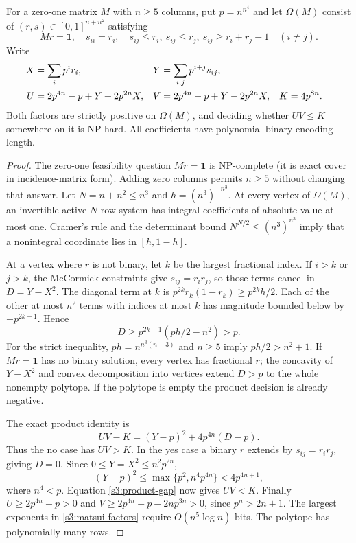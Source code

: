 \begin{lemma}\label{s3:matsui}
For a zero-one matrix $M$ with $n\ge5$ columns, put $p=n^{n^4}$ and let
$\Omega(M)$ consist of $(r,s)\in[0,1]^{n+n^2}$ satisfying
\[
 Mr=\mathbf1,\quad s_{ii}=r_i,\quad
 s_{ij}\le r_i,\ s_{ij}\le r_j,\ s_{ij}\ge r_i+r_j-1\quad(i\ne j).
\]
Write
\begin{align}
 X&=\sum_i p^i r_i,&Y&=\sum_{i,j}p^{i+j}s_{ij},\notag\\
 U&=2p^{4n}-p+Y+2p^{2n}X,&
 V&=2p^{4n}-p+Y-2p^{2n}X,&K&=4p^{8n}.
 \label{s3:matsui-factors}
\end{align}
Both factors are strictly positive on $\Omega(M)$, and deciding whether
$UV\le K$ somewhere on it is NP-hard. All coefficients have polynomial
binary encoding length.
\end{lemma}
\begin{proof}
The zero-one feasibility question $Mr=\mathbf1$ is NP-complete (it is
exact cover in incidence-matrix form). Adding zero columns permits
$n\ge5$ without changing that answer. Let $N=n+n^2\le n^3$ and
$h=(n^3)^{-n^3}$. At every vertex of $\Omega(M)$, an invertible active
$N$-row system has integral coefficients of absolute value at most one.
Cramer's rule and the determinant bound $N^{N/2}\le(n^3)^{n^3}$ imply
that a nonintegral coordinate lies in $[h,1-h]$.

At a vertex where $r$ is not binary, let $k$ be the largest fractional
index. If $i>k$ or $j>k$, the McCormick constraints give
$s_{ij}=r_ir_j$, so those terms cancel in $D=Y-X^2$. The diagonal
term at $k$ is $p^{2k}r_k(1-r_k)\ge p^{2k}h/2$. Each of the other
at most $n^2$ terms with indices at most $k$ has magnitude bounded
below by $-p^{2k-1}$. Hence
\begin{equation}
 D\ge p^{2k-1}(ph/2-n^2)>p.\label{s3:corrected-matsui-gap}
\end{equation}
For the strict inequality, $ph=n^{n^3(n-3)}$ and $n\ge5$ imply
$ph/2>n^2+1$. If $Mr=\mathbf1$ has no binary solution, every vertex
has fractional $r$; the concavity of $Y-X^2$ and convex decomposition
into vertices extend $D>p$ to the whole nonempty polytope. If the
polytope is empty the product decision is already negative.

The exact product identity is
\begin{equation}
 UV-K=(Y-p)^2+4p^{4n}(D-p).\label{s3:product-gap}
\end{equation}
Thus the no case has $UV>K$. In the yes case a binary $r$ extends by
$s_{ij}=r_ir_j$, giving $D=0$. Since $0\le Y=X^2\le n^2p^{2n}$,
\[
 (Y-p)^2\le\max\{p^2,n^4p^{4n}\}<4p^{4n+1},
\]
where $n^4<p$. Equation \eqref{s3:product-gap} now gives $UV<K$.
Finally $U\ge2p^{4n}-p>0$ and
$V\ge2p^{4n}-p-2np^{3n}>0$, since $p^n>2n+1$.
The largest exponents in \eqref{s3:matsui-factors} require
$O(n^5\log n)$ bits. The polytope has polynomially many rows.
\end{proof}

